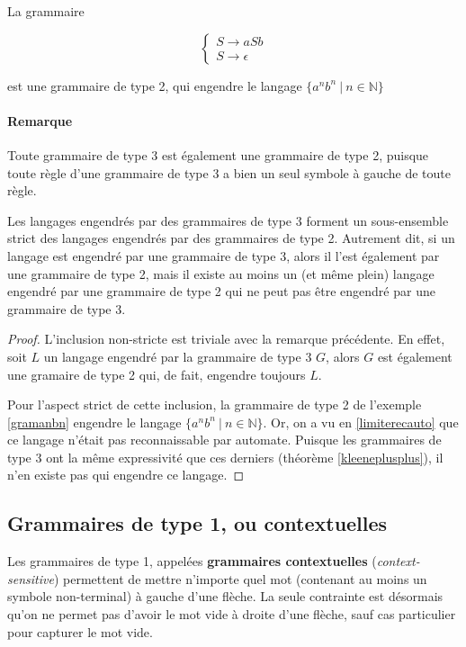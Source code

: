 \begin{example}
\label{gramanbn}
La grammaire 

\[
\begin{cases}
S \rightarrow aSb \\
S \rightarrow \epsilon
\end{cases}
\]

est une grammaire de type 2, qui engendre le langage $\{a^nb^n ~|~n \in \mathbb{N}\}$
\end{example}

\paragraph{Remarque} Toute grammaire de type 3 est également une grammaire de type 2, puisque toute règle d'une grammaire de type 3 a bien un seul symbole à gauche de toute règle.

\begin{lemma}
Les langages engendrés par des grammaires de type 3 forment un sous-ensemble strict des langages engendrés par des grammaires de type 2. Autrement dit, si un langage est engendré par une grammaire de type 3, alors il l'est également par une grammaire de type 2, mais il existe au moins un (et même plein) langage engendré par une grammaire de type 2 qui ne peut pas être engendré par une grammaire de type 3.  
\end{lemma}

\begin{proof}
L'inclusion non-stricte est triviale avec la remarque précédente. En effet, soit $L$ un langage engendré par la grammaire de type 3 $G$, alors $G$ est également une gramaire de type 2 qui, de fait, engendre toujours $L$.

Pour l'aspect strict de cette inclusion, la grammaire de type 2 de l'exemple \ref{gramanbn} engendre le langage $\{a^nb^n ~|~ n \in \mathbb{N}\}$. Or, on a vu en \ref{limiterecauto} que ce langage n'était pas reconnaissable par automate. Puisque les grammaires de type 3 ont la même expressivité que ces derniers (théorème \ref{kleeneplusplus}), il n'en existe pas qui engendre ce langage.
\end{proof}




\subsection{Grammaires de type 1, ou contextuelles}

Les grammaires de type 1, appelées \textbf{grammaires contextuelles} (\textit{context-sensitive}) permettent de mettre n'importe quel mot (contenant au moins un symbole non-terminal) à gauche d'une flèche. La seule contrainte est désormais qu'on ne permet pas d'avoir le mot vide à droite d'une flèche, sauf cas particulier pour capturer le mot vide.

